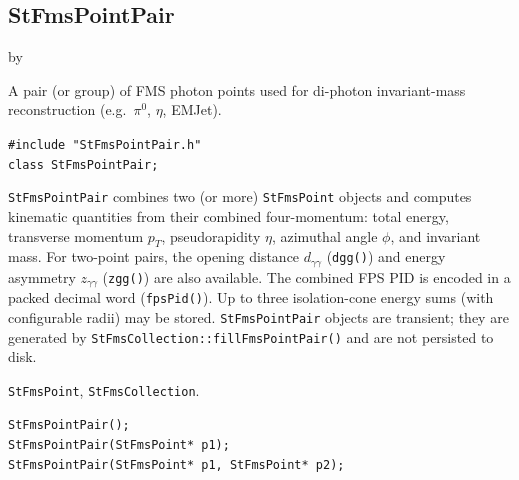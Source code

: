 \documentclass[twoside]{article}
\newcommand{\entrylabel}[1]{\mbox{\textbf{{#1}}}\hfil}%
\newenvironment{entry}
{\begin{list}{}%
    {\renewcommand{\makelabel}{\entrylabel}%
     \setlength{\labelwidth}{90pt}%
     \setlength{\leftmargin}{\labelwidth}
     \advance\leftmargin by \labelsep%
      }%
    }%
  {\end{list}}
\newcommand{\Entrylabel}[1]%
{\raisebox{0pt}[1ex][0pt]{\makebox[\labelwidth][l]%
    {\parbox[t]{\labelwidth}{\hspace{0pt}\textbf{{#1}}}}}}
\newenvironment{Entry}%
{\renewcommand{\entrylabel}{\Entrylabel}\begin{entry}}%
  {\end{entry}}
\begin{document}
\subsection{StFmsPointPair}
\label{sec:StFmsPointPair}
\begin{Entry}
\item[Summary]
    A pair (or group) of FMS photon points used for di-photon invariant-mass
    reconstruction (e.g.\ $\pi^{0}$, $\eta$, EMJet).

\item[Synopsis]
    \verb+#include "StFmsPointPair.h"+\\
    \verb+class StFmsPointPair;+\\

\item[Description]
    \texttt{StFmsPointPair} combines two (or more) \texttt{StFmsPoint}
    objects and computes kinematic quantities from their combined
    four-momentum: total energy, transverse momentum $p_T$,
    pseudorapidity $\eta$, azimuthal angle $\phi$, and invariant mass.
    For two-point pairs, the opening distance $d_{\gamma\gamma}$
    (\texttt{dgg()}) and energy asymmetry $z_{\gamma\gamma}$
    (\texttt{zgg()}) are also available.  The combined FPS PID is encoded
    in a packed decimal word (\texttt{fpsPid()}).  Up to three isolation-cone
    energy sums (with configurable radii) may be stored.
    \texttt{StFmsPointPair} objects are transient; they are generated by
    \texttt{StFmsCollection::fillFmsPointPair()} and are not
    persisted to disk.

\item[Related Classes]
    \texttt{StFmsPoint}, \texttt{StFmsCollection}.

\item[Public\\ Constructors]
    \verb+StFmsPointPair();+\\
    \verb+StFmsPointPair(StFmsPoint* p1);+\\
    \verb+StFmsPointPair(StFmsPoint* p1, StFmsPoint* p2);+\\


\end{Entry}
\end{document}
